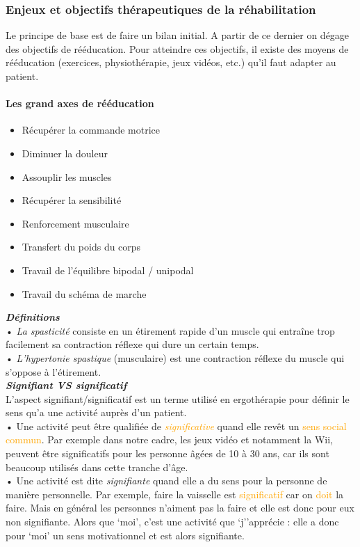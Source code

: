 	\subsubsection{Enjeux et objectifs thérapeutiques de la réhabilitation}
Le principe de base est de faire un bilan initial.  A partir de ce dernier on dégage des objectifs  de rééducation. Pour atteindre ces objectifs, il existe des moyens de rééducation (exercices, physiothérapie, jeux vidéos, etc.) qu'il faut adapter au patient.

\paragraph{Les grand axes de rééducation}
\begin{itemize} 
	\item Récupérer la commande motrice 
	\item Diminuer la douleur
	\item Assouplir les muscles 
	\item Récupérer la sensibilité 
	\item Renforcement musculaire 
	\item Transfert du poids du corps 
	\item Travail de l'équilibre bipodal / unipodal 
	\item Travail du schéma de marche
\end{itemize}

	\textbf{\emph{Définitions}\\}
• \emph{La spasticité} consiste en un étirement rapide d'un muscle qui entraîne trop facilement sa contraction réflexe qui dure un certain temps. \\
• \emph{L’hypertonie spastique} (musculaire) est une contraction réflexe du muscle qui s'oppose à l'étirement.\\

	\textbf{\emph{Signifiant VS significatif}\\}
L’aspect signifiant/significatif est un terme utilisé en ergothérapie pour définir le sens qu'a une activité auprès d’un patient.\\
• Une activité peut être qualifiée de \emph{\textcolor{orange}{significative}} quand elle revêt un \textcolor{orange}{sens social commun}. Par exemple dans notre cadre, les jeux vidéo et notamment la Wii, peuvent être significatifs pour les personne âgées de 10 à 30 ans, car ils sont beaucoup utilisés dans cette tranche d'âge.\\
• Une activité est dite \emph{\textcolor{vert}{signifiante}} quand elle a du sens pour la personne de \textcolor{vert}{manière personnelle}. Par exemple, faire la vaisselle est \textcolor{orange}{significatif }car on \textcolor{orange}{doit} la faire. Mais en général les personnes n’aiment pas la faire et elle est donc pour eux non signifiante. Alors que ‘moi’, c'est une activité que ‘j’’apprécie :  elle a donc pour ‘moi’ un sens motivationnel et est alors signifiante.


